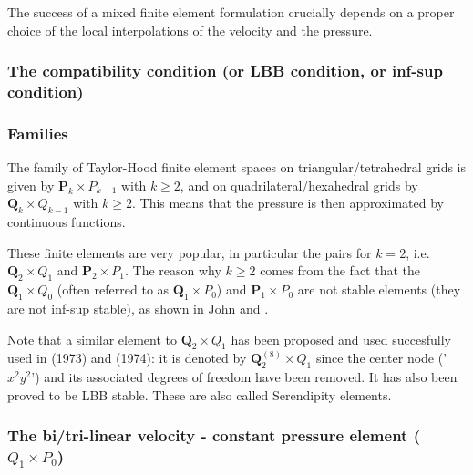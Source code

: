 

The success of a mixed finite element formulation crucially depends on a proper choice of the local interpolations of the velocity and the pressure. 

\subsubsection{The compatibility condition (or LBB condition, or inf-sup condition)} \label{ss:LBBcond}
 



\subsubsection{Families}

The family of {\color{olive} Taylor-Hood} finite element spaces on triangular/tetrahedral 
grids is given by ${\bm P}_k \times P_{k-1}$ with $k\geq 2$, 
and on quadrilateral/hexahedral grids by ${\bm Q}_k \times Q_{k-1}$ with $k\geq 2$.
This means that the pressure is then approximated by continuous functions. 

These finite elements are very popular, in particular the pairs for $k=2$, i.e.
${\bm Q}_2\times Q_1$ and ${\bm P}_2\times P_1$.
The reason why $k\geq 2$ comes from the fact that the 
${\bm Q}_1 \times Q_0$ (often referred to as ${\bm Q}_1 \times P_0$) and ${\bm P}_1\times P_0$
are not stable elements (they are not inf-sup stable), as
shown in John \cite[p64]{john16} and \cite[p67]{john16}. 

\begin{remark}
Note that a similar element to ${\bm Q}_2 \times Q_1$ has been proposed
and used succesfully used in \textcite{taho73} (1973) and \textcite{hota74} (1974): 
it is denoted by ${\bm Q}_2^{(8)} \times Q_1$ 
since the center node ('$x^2y^2$') and its associated degrees of freedom have been removed. It 
has also been proved to be LBB stable. These are also called {\color{olive} Serendipity} elements. 
\end{remark}

\subsubsection{The bi/tri-linear velocity - constant pressure element ($Q_1\times P_0$)}
\label{ss:pairq1p0}


